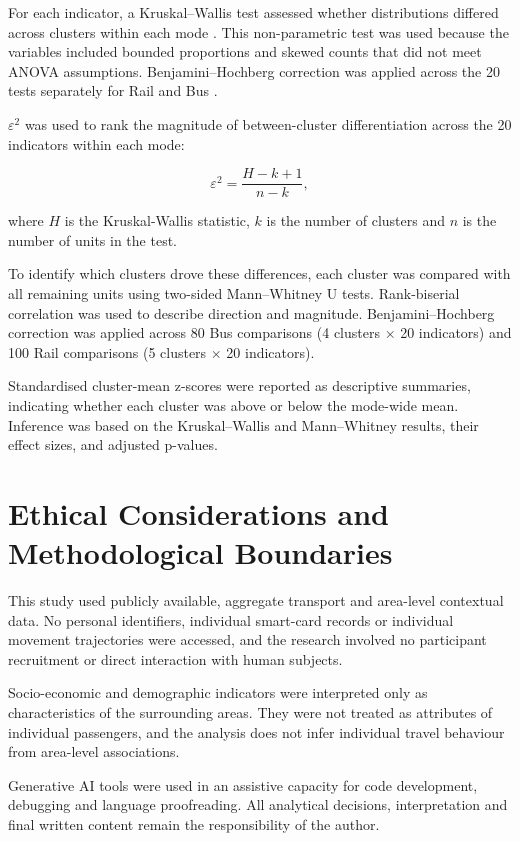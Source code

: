 For each indicator, a Kruskal--Wallis test assessed whether distributions differed across clusters within each mode \citep{Kruskal1952}. This non-parametric test was used because the variables included bounded proportions and skewed counts that did not meet ANOVA assumptions. Benjamini--Hochberg correction was applied across the 20 tests separately for Rail and Bus \citep{Benjamini1995}.

$\varepsilon^2$ was used to rank the magnitude of between-cluster differentiation across the 20 indicators within each mode:

\begin{equation}
\varepsilon^2 = \frac{H - k + 1}{n - k},
\end{equation}

where $H$ is the Kruskal-Wallis statistic, $k$ is the number of clusters and $n$ is the number of units in the test.

To identify which clusters drove these differences, each cluster was compared with all remaining units using two-sided Mann--Whitney U tests. Rank-biserial correlation was used to describe direction and magnitude. Benjamini--Hochberg correction was applied across 80 Bus comparisons (4 clusters $\times$ 20 indicators) and 100 Rail comparisons (5 clusters $\times$ 20 indicators).

Standardised cluster-mean z-scores were reported as descriptive summaries, indicating whether each cluster was above or below the mode-wide mean. Inference was based on the Kruskal--Wallis and Mann--Whitney results, their effect sizes, and adjusted p-values.

\section{Ethical Considerations and Methodological Boundaries}

This study used publicly available, aggregate transport and area-level contextual data. No personal identifiers, individual smart-card records or individual movement trajectories were accessed, and the research involved no participant recruitment or direct interaction with human subjects.

Socio-economic and demographic indicators were interpreted only as characteristics of the surrounding areas. They were not treated as attributes of individual passengers, and the analysis does not infer individual travel behaviour from area-level associations.

Generative AI tools were used in an assistive capacity for code development, debugging and language proofreading. All analytical decisions, interpretation and final written content remain the responsibility of the author.
